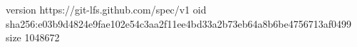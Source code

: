 version https://git-lfs.github.com/spec/v1
oid sha256:e03b9d4824e9fae102e54c3aa2f11ee4bd33a2b73eb64a8b6be4756713af0499
size 1048672
